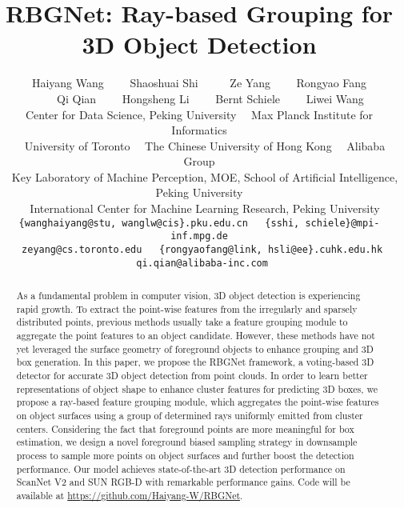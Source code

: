\documentclass[final]{cvpr}
\begin{document}
\title{RBGNet: Ray-based Grouping for 3D Object Detection}
\author{
Haiyang Wang ~~~~Shaoshuai Shi~ ~~~~Ze Yang  ~~~~Rongyao Fang  \\
~~~~Qi Qian  ~~~~Hongsheng Li  ~~~~Bernt Schiele  ~~~~Liwei Wang   \\
{\normalsize
{}Center for Data Science, Peking University ~~{}Max Planck Institute for Informatics}\\
{\normalsize{\hspace*{-16pt}}
~~{}University of Toronto
~~{}The Chinese University of Hong Kong
~~{}Alibaba Group
}
\\
{\normalsize~~{}Key Laboratory of Machine Perception, MOE, School of Artificial Intelligence, Peking University}\\
{\normalsize~~{}International Center for Machine Learning Research, Peking University}\\
{\tt\small \{wanghaiyang@stu, wanglw@cis\}.pku.edu.cn
~~\{sshi, schiele\}@mpi-inf.mpg.de}\\
{\tt\small
zeyang@cs.toronto.edu
~~\{rongyaofang@link, hsli@ee\}.cuhk.edu.hk
~~qi.qian@alibaba-inc.com
}
}


\maketitle
\pagestyle{empty}
\thispagestyle{empty}


\begin{abstract}
As a fundamental problem in computer vision, 3D object detection is experiencing rapid growth. To extract the point-wise features from the irregularly and sparsely distributed points, previous methods usually take a feature grouping module to aggregate the point features to an object candidate. However, these methods have not yet leveraged the surface geometry of foreground objects to enhance grouping and 3D box generation. In this paper, we propose the RBGNet framework, a voting-based 3D detector for accurate 3D object detection from point clouds. In order to learn better representations of object shape to enhance cluster features for predicting 3D boxes, we propose a ray-based feature grouping module, which aggregates the point-wise features on object surfaces using a group of determined rays uniformly emitted from cluster centers. 
Considering the fact that foreground points are more meaningful for box estimation, we design a novel foreground biased sampling strategy in downsample process to sample more points on object surfaces and further boost the detection performance. Our model achieves state-of-the-art 3D detection performance on ScanNet V2 and SUN RGB-D with remarkable performance gains. Code will be available at \url{https://github.com/Haiyang-W/RBGNet}.
\end{abstract}
\vspace{-5pt}
\end{document}
